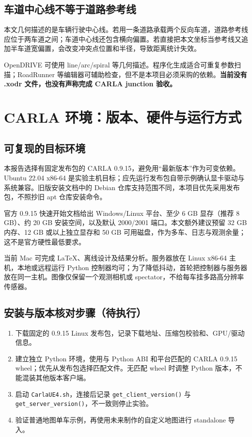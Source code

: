 \documentclass[UTF8,fontset=fandol,11pt,a4paper]{ctexart}
\newcommand{\page}[1]{\clearpage\section{#1}}
\begin{document}
\subsection{车道中心线不等于道路参考线}
本文几何描述的是车辆行驶中心线。若用一条道路承载两个反向车道，道路参考线应位于两车道之间；车道中心线还包含横向偏置。若直接把本文坐标当参考线又追加半车道宽偏置，会改变冲突点位置和半径，导致距离统计失效。

OpenDRIVE 可使用 line/arc/spiral 等几何描述。程序化生成适合可重复参数扫描；RoadRunner 等编辑器可辅助检查，但不是本项目必须采购的依赖。\textbf{当前没有 .xodr 文件，也没有声称完成 CARLA junction 验收。}

\page{CARLA 环境：版本、硬件与运行方式}
\subsection{可复现的目标环境}
本报告选择有固定发布包的 CARLA 0.9.15\cite{carla_release}，避免用“最新版本”作为可变依赖。Ubuntu 22.04 x86-64 是实验主机目标；应先运行发布包自带示例确认显卡驱动与系统兼容。旧版安装文档中的 Debian 仓库支持范围不同，本项目优先采用发布包，不照抄旧 apt 仓库安装命令。

官方 0.9.15 快速开始文档给出 Windows/Linux 平台、至少 6 GB 显存（推荐 8 GB）、约 20 GB 安装空间，以及默认 2000/2001 端口\cite{carla_start}。本文额外建议预留 32 GB 内存、12 GB 或以上独立显存和 50 GB 可用磁盘，作为多车、日志与观测余量；这不是官方硬性最低要求。

当前 Mac 可完成 LaTeX、离线设计及结果分析。服务器放在 Linux x86-64 主机，本地或远程运行 Python 控制器均可；为了降低抖动，首轮把控制器与服务器放在同一主机。图像仅保留一个观测相机或 spectator，不给每车挂多路高分辨率传感器。

\subsection{安装与版本核对步骤（待执行）}
\begin{enumerate}
\item 下载固定的 0.9.15 Linux 发布包，记录下载地址、压缩包校验和、GPU/驱动信息。
\item 建立独立 Python 环境，使用与 Python ABI 和平台匹配的 CARLA 0.9.15 wheel；优先从发布包选择匹配文件。无匹配 wheel 时调整 Python 版本，不能混装其他版本客户端。
\item 启动 \texttt{CarlaUE4.sh}，连接后记录 \texttt{get\_client\_version()} 与 \texttt{get\_server\_version()}，不一致则停止实验。
\item 验证普通地图单车示例，再使用未来制作的自定义地图进行 standalone 导入。
\end{enumerate}
\end{document}
